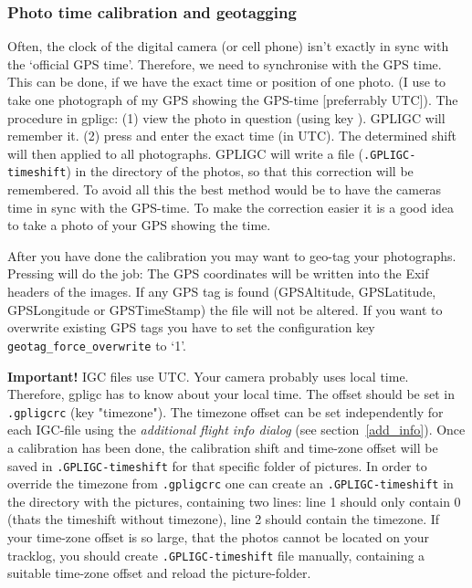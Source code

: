 \subsubsection{Photo time calibration and geotagging}
\label{photo_time}
Often, the clock of the digital camera (or cell phone) isn't exactly in sync with the `official GPS time'.
Therefore, we need to synchronise with the GPS time.
This can be done, if we have the exact time or position of one photo.
(I use to take one photograph of my GPS showing the GPS-time [preferrably UTC]).
The procedure in gpligc: (1) view the photo in question (using key ).
GPLIGC will remember it. (2) press  and enter the exact time (in UTC).
The determined shift will then applied to all photographs.
GPLIGC will write a file (\texttt{.GPLIGC-timeshift}) in the directory of the photos, so that this correction will be remembered.
To avoid all this the best method would be to have the cameras time in sync with the GPS-time. To make the correction easier it is a good idea to take a photo of your GPS showing the time.

After you have done the calibration you may want to geo-tag your photographs. Pressing  will do the job: The GPS coordinates will be written into the Exif headers of the images.
If any GPS tag is found (GPSAltitude, GPSLatitude, GPSLongitude or GPSTimeStamp) the file will not be altered.
If you want to overwrite existing GPS tags you have to set the configuration key \texttt{geotag\_force\_overwrite} to `1'.


\textbf{Important!}  IGC files use UTC. Your camera probably uses local time. Therefore, gpligc has to know about your local time. The offset should be set in \texttt{.gpligcrc} (key "timezone"). The timezone offset can be set independently for each IGC-file using the \emph{additional flight info dialog} (see section~\ref{add_info}).
Once a calibration has been done, the calibration shift and time-zone offset will be saved in \texttt{.GPLIGC-timeshift} for that specific folder of pictures. In order to override the timezone from \texttt{.gpligcrc} one can create an \texttt{.GPLIGC-timeshift} in the directory with the pictures, containing two lines: line 1 should only contain 0 (thats the timeshift without timezone), line 2 should contain the timezone.
If your time-zone offset is so large, that the photos cannot be located on your tracklog, you should create \texttt{.GPLIGC-timeshift} file manually, containing a suitable time-zone offset and reload the picture-folder.


